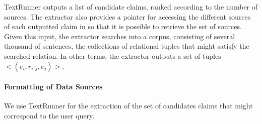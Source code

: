 TextRunner outputs a list of candidate claims, ranked according to the number of sources. The extractor also provides a pointer
for accessing the different sources of each outputted claim in so that it is possible to retrieve the set of sources. Given this input,
the extractor searches into a corpus, consisting of several thousand of sentences, the collections of relational tuples that might satisfy
the searched relation. In other terms, the extractor outputs a set of tuples $<(e_i, r_{i,j}, e_j)>$.

\paragraph*{Formatting of Data Sources}
We use TextRunner for the extraction of the set of 
candidates claims that might correspond to the user query.